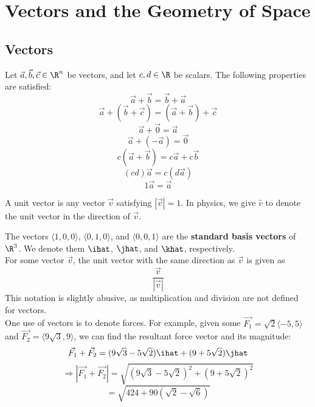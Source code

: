 \chapter{Vectors and the Geometry of Space}
\section{Vectors}
\begin{theorem}\label{thm:1}
	Let $\vec{a},\vec{b},\vec{c}\in\R^n$ be vectors, and let $c,d\in\R$ be scalars. The following properties are satisfied:
	$$\vec{a}+\vec{b}=\vec{b}+\vec{a}$$
	$$\vec{a}+(\vec{b}+\vec{c})=(\vec{a}+\vec{b})+\vec{c}$$
	$$\vec{a}+\vec{0}=\vec{a}$$
	$$\vec{a}+(-\vec{a})=\vec{0}$$
	$$c(\vec{a}+\vec{b})=c\vec{a}+c\vec{b}$$
	$$(cd)\vec{a}=c(d\vec{a})$$
	$$1\vec{a}=\vec{a}$$
\end{theorem}
\begin{definition}\label{def:1}
	A unit vector is any vector $\vec{v}$ satisfying $|\vec{v}|=1$. In physics, we give $\hat{v}$ to denote the unit vector in the direction of $\vec{v}$.
\end{definition}
The vectors $\langle1,0,0\rangle$, $\langle0,1,0\rangle$, and $\langle0,0,1\rangle$ are the \textbf{standard basis vectors} of $\R^3$. We denote them $\ihat$, $\jhat$, and $\khat$, respectively.\\
For some vector $\vec{v}$, the unit vector with the same direction as $\vec{v}$ is given as
$$\frac{\vec{v}}{|\vec{v}|}$$
This notation is slightly abusive, as multiplication and division are not defined for vectors.\\
One use of vectors is to denote forces. For example, given some $\vec{F_1}=\sqrt{2}\langle-5,5\rangle$ and $\vec{F_2}=\langle9\sqrt{3},9\rangle$, we can find the resultant force vector and its magnitude:
$$\vec{F_1}+\vec{F_2}=(9\sqrt{3}-5\sqrt{2})\ihat+(9+5\sqrt{2})\jhat$$
$$\Rightarrow|\vec{F_1}+\vec{F_2}|=\sqrt{(9\sqrt{3}-5\sqrt{2})^2+(9+5\sqrt{2})^2}$$
$$=\sqrt{424+90(\sqrt{2}-\sqrt{6})}$$
	
